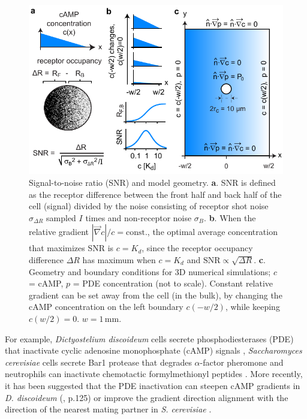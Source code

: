 \documentclass[%
 reprint,
 amsmath,amssymb,
 aps,prl,
 showpacs,
 linenumbers
]{revtex4-1}
\begin{document}
\begin{figure}[t]
	\centering
	\includegraphics[scale=0.7]{../figures/fig1}
	\caption{\linespread{1.0}\selectfont{}Signal-to-noise ratio (SNR) and model geometry. 
	\textbf{a}. SNR is defined as the receptor difference between the front half and back half of the cell (signal) divided by the noise consisting of receptor shot noise $\sigma_{\Delta R}$ sampled $I$ times and non-receptor noise $\sigma_B$.
	\textbf{b}. When the relative gradient $|\vec{\nabla}c|/c = \mathrm{const.}$, the optimal average concentration that maximizes SNR is $c=K_d$, since the receptor occupancy difference $\Delta R$ has maximum when $c=K_d$ and $\mathrm{SNR} \propto \sqrt{\Delta R}$.
	\textbf{c}. Geometry and boundary conditions for 3D numerical simulations; $c$ = cAMP, $p$ = PDE concentration (not to scale). Constant relative gradient can be set away from the cell (in the bulk), by changing the cAMP concentration on the left boundary $c(-w/2)$, while keeping $c(w/2) = 0$. $w = 1\,\mathrm{mm}$.
	}
	\label{fig:geom}
\end{figure}
For example, \emph{Dictyostelium discoideum} cells secrete phosphodiesterases (PDE) \cite{PDE} that inactivate cyclic adenosine monophosphate (cAMP) signals \cite{kessinBook}, \emph{Saccharomyces cerevisiae} cells secrete Bar1 protease that degrades $\alpha$-factor pheromone \cite{yeast1,yeast2,yeast3} and neutrophils can inactivate chemotactic formylmethionyl peptides \cite{zigchemotaxis}.
More recently, it has been suggested that the PDE inactivation can steepen cAMP gradients in \emph{D. discoideum} (\cite{kessinBook}, p.125) or improve the gradient direction alignment with the direction of the nearest mating partner in \emph{S. cerevisiae} \cite{yeast1,yeast2,yeast3}.
\end{document}
